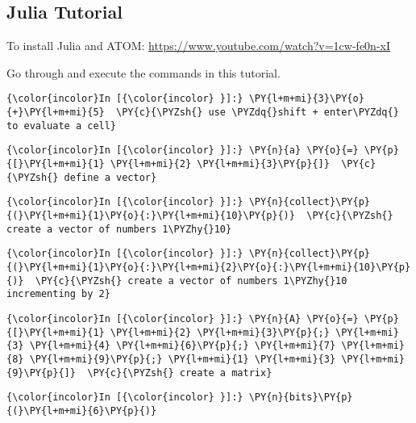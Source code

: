 \subsection{Julia Tutorial}

To install Julia and ATOM:
\url{https://www.youtube.com/watch?v=1cw-fe0n-xI}



Go through and execute the commands in this tutorial.
    
    \begin{Verbatim}[commandchars=\\\{\}]
{\color{incolor}In [{\color{incolor} }]:} \PY{l+m+mi}{3}\PY{o}{+}\PY{l+m+mi}{5}  \PY{c}{\PYZsh{} use \PYZdq{}shift + enter\PYZdq{} to evaluate a cell}
\end{Verbatim}


    \begin{Verbatim}[commandchars=\\\{\}]
{\color{incolor}In [{\color{incolor} }]:} \PY{n}{a} \PY{o}{=} \PY{p}{[}\PY{l+m+mi}{1} \PY{l+m+mi}{2} \PY{l+m+mi}{3}\PY{p}{]}  \PY{c}{\PYZsh{} define a vector}
\end{Verbatim}


    \begin{Verbatim}[commandchars=\\\{\}]
{\color{incolor}In [{\color{incolor} }]:} \PY{n}{collect}\PY{p}{(}\PY{l+m+mi}{1}\PY{o}{:}\PY{l+m+mi}{10}\PY{p}{)}  \PY{c}{\PYZsh{} create a vector of numbers 1\PYZhy{}10}
\end{Verbatim}


    \begin{Verbatim}[commandchars=\\\{\}]
{\color{incolor}In [{\color{incolor} }]:} \PY{n}{collect}\PY{p}{(}\PY{l+m+mi}{1}\PY{o}{:}\PY{l+m+mi}{2}\PY{o}{:}\PY{l+m+mi}{10}\PY{p}{)}  \PY{c}{\PYZsh{} create a vector of numbers 1\PYZhy{}10 incrementing by 2}
\end{Verbatim}


    \begin{Verbatim}[commandchars=\\\{\}]
{\color{incolor}In [{\color{incolor} }]:} \PY{n}{A} \PY{o}{=} \PY{p}{[}\PY{l+m+mi}{1} \PY{l+m+mi}{2} \PY{l+m+mi}{3}\PY{p}{;} \PY{l+m+mi}{3} \PY{l+m+mi}{4} \PY{l+m+mi}{6}\PY{p}{;} \PY{l+m+mi}{7} \PY{l+m+mi}{8} \PY{l+m+mi}{9}\PY{p}{;} \PY{l+m+mi}{1} \PY{l+m+mi}{3} \PY{l+m+mi}{9}\PY{p}{]}  \PY{c}{\PYZsh{} create a matrix}
\end{Verbatim}


    \begin{Verbatim}[commandchars=\\\{\}]
{\color{incolor}In [{\color{incolor} }]:} \PY{n}{bits}\PY{p}{(}\PY{l+m+mi}{6}\PY{p}{)}
\end{Verbatim}



